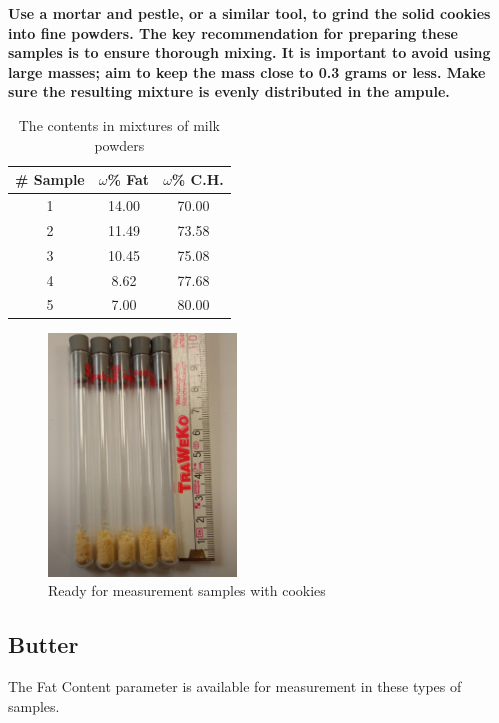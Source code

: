 \documentclass[a4paper,12pt]{article}
\begin{document}
\textbf{
Use a mortar and pestle, or a similar tool, to grind the solid cookies into fine powders.
The key recommendation for preparing these samples is to ensure thorough mixing. 
It is important to avoid using large masses; aim to keep the mass close to 0.3 grams or less. 
Make sure the resulting mixture is evenly distributed in the ampule.
}

\begin{table}[H]
\centering
\caption{The contents in mixtures of milk powders}
\label{tab:Cookies Mixture}
\begin{tabular}{|c|c|c|}
\hline
\textbf{\#  Sample} & \textbf{$\omega$\% Fat} & \textbf{$\omega$\% C.H.} \\ \hline
1                   & 14.00            & 70.00             \\ \hline
2                   & 11.49            & 73.58             \\ \hline
3                   & 10.45            & 75.08             \\ \hline
4                   & 8.62             & 77.68             \\ \hline
5                   & 7.00             & 80.00             \\ \hline
\end{tabular}
\end{table}

\begin{figure}[H]
\centering
\includegraphics[width=5cm]{cookie.jpg}
\caption{Ready for measurement samples with cookies}
\label{fig:cookie}
\end{figure}

\newpage
\subsection{Butter}
\label{sec:Butter}
The Fat Content parameter is available for measurement in these types of samples.
\end{document}
